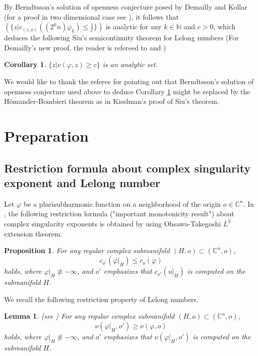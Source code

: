 \documentclass[reqno]{amsart}
\newtheorem{Corollary}[Theorem]{Corollary}
\newtheorem{Lemma}[Theorem]{Lemma}
\newtheorem{Proposition}[Theorem]{Proposition}
\numberwithin{equation}{section}
\begin{document}
By Berndtsson's solution of openness conjecture \cite{berndtsson13} posed by Demailly and Kollar \cite{D-K01}
(for a proof in two dimensional case see \cite{FM05j,FM05v,FM-book04}),
it follows that
$(\{z|c_{(z,o)}((2^{k}n)\varphi_{k})\leq \frac{1}{c}\})$ is analytic for any $k\in\mathbb{N}$ and $c>0$,
which deduces the following Siu's semicontinuity theorem for Lelong numbers \cite{siu74}
(For Demailly's new proof, the reader is refereed to \cite{demailly-book} and \cite{demailly2010})

\begin{Corollary}
\label{coro:siu}\cite{siu74}
$\{z|\nu(\varphi,z)\geq c\}$ is an analytic set.
\end{Corollary}

We would like to thank the referee for pointing out that Berndtsson's solution of openness conjecture used above to deduce Corollary \ref{coro:siu}
might be replaced by the H\"{o}mander-Bombieri theorem as in Kiselman's proof of Siu's theorem.

\section{Preparation}

\subsection{Restriction formula about complex singularity exponent and Lelong number}

Let $\varphi$ be a plurisubharmonic function on a neighborhood of the origin $o\in\mathbb{C}^{n}$.
In \cite{D-K01}, the following restriction formula ("important monotonicity result") about complex singularity exponents is obtained
by using Ohsawa-Takegoshi $L^2$ extension theorem.

\begin{Proposition}
\label{prop:DK2000}\cite{D-K01}
For any regular complex submanifold $(H,o)\subset(\mathbb{C}^{n},o)$,
\begin{equation}
\label{equ:monotone_lct}
c_{o'}(\varphi|_{H})\leq c_{o}(\varphi)
\end{equation}
holds,
where $\varphi|_{H}\not\equiv-\infty$,
and $o'$ emphasizes that $c_{o'}(u|_{H})$ is computed on the submanifold $H$.
\end{Proposition}

We recall the following restriction property of Lelong numbers.

\begin{Lemma}
\label{lem:lelong}(see \cite{demailly-book})
For any regular complex submanifold $(H,o)\subset(\mathbb{C}^{n},o)$,
\begin{equation}
\label{equ:monotone_lelong}
\nu(\varphi|_{H},o')\geq \nu(\varphi,o)
\end{equation}
holds,
where $\varphi|_{H}\not\equiv-\infty$,
and $o'$ emphasizes that $\nu(\varphi|_{H},o')$ is computed on the submanifold $H$.
\end{Lemma}
\end{document}
